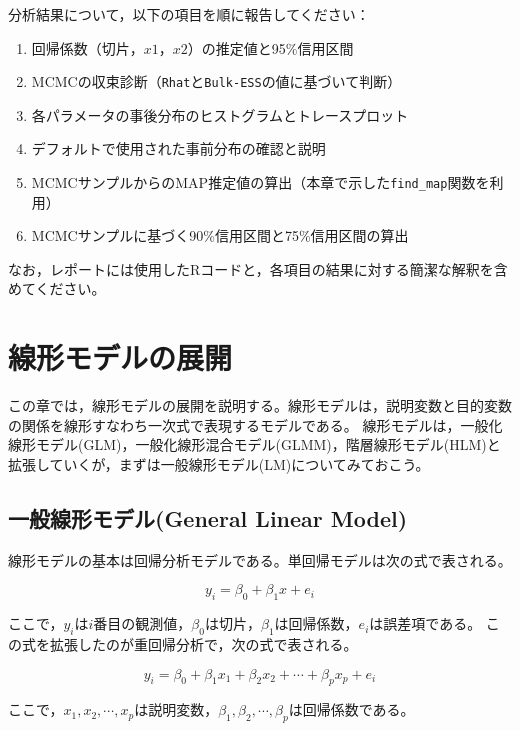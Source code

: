 \documentclass[
  a4paper,
]{ltjsbook}
\providecommand{\tightlist}{%
  \setlength{\itemsep}{0pt}\setlength{\parskip}{0pt}}
\begin{document}
分析結果について，以下の項目を順に報告してください：

\begin{enumerate}
\def\labelenumi{\arabic{enumi}.}
\tightlist
\item
  回帰係数（切片，\(x1\)，\(x2\)）の推定値と95\%信用区間
\item
  MCMCの収束診断（\texttt{Rhat}と\texttt{Bulk-ESS}の値に基づいて判断）
\item
  各パラメータの事後分布のヒストグラムとトレースプロット
\item
  デフォルトで使用された事前分布の確認と説明
\item
  MCMCサンプルからのMAP推定値の算出（本章で示した\texttt{find\_map}関数を利用）
\item
  MCMCサンプルに基づく90\%信用区間と75\%信用区間の算出
\end{enumerate}

なお，レポートには使用したRコードと，各項目の結果に対する簡潔な解釈を含めてください。


\chapter{線形モデルの展開}\label{ux7ddaux5f62ux30e2ux30c7ux30ebux306eux5c55ux958b}

この章では，線形モデルの展開を説明する。線形モデルは，説明変数と目的変数の関係を線形すなわち一次式で表現するモデルである。
線形モデルは，一般化線形モデル(GLM)，一般化線形混合モデル(GLMM)，階層線形モデル(HLM)と拡張していくが，まずは一般線形モデル(LM)についてみておこう。

\section{一般線形モデル(General Linear
Model)}\label{ux4e00ux822cux7ddaux5f62ux30e2ux30c7ux30ebgeneral-linear-model}

線形モデルの基本は回帰分析モデルである。単回帰モデルは次の式で表される。

\[
y_i = \beta_0 + \beta_1 x + e_i
\]

ここで，\(y_i\)は\(i\)番目の観測値，\(\beta_0\)は切片，\(\beta_1\)は回帰係数，\(e_i\)は誤差項である。
この式を拡張したのが重回帰分析で，次の式で表される。

\[
y_i = \beta_0 + \beta_1 x_1 + \beta_2 x_2 + \cdots + \beta_p x_p + e_i
\]

ここで，\(x_1, x_2, \cdots, x_p\)は説明変数，\(\beta_1, \beta_2, \cdots, \beta_p\)は回帰係数である。
\end{document}
